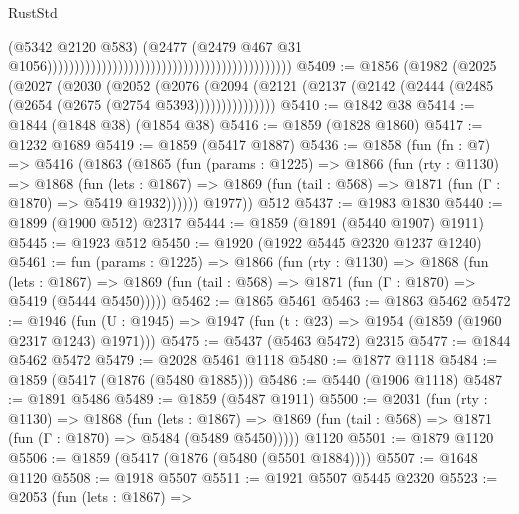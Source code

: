 \begin{lexlean}{RustStd}
\begin{coremodule}
                                                                                          (@5342
                                                                                            @2120
                                                                                            @583)
                                                                                          (@2477
                                                                                            (@2479
                                                                                              @467
                                                                                              @31
                                                                                              @1056)))))))))))))))))))))))))))))))))))))))))))))
@5409 := @1856
    (@1982
      (@2025
        (@2027
          (@2030
            (@2052
              (@2076
                (@2094 (@2121 (@2137 (@2142 (@2444 (@2485 (@2654 (@2675 (@2754 @5393)))))))))))))))
@5410 := @1842 @38
@5414 := @1844 (@1848 @38) (@1854 @38)
@5416 := @1859 (@1828 @1860)
@5417 := @1232 @1689
@5419 := @1859 (@5417 @1887)
@5436 := @1858
    (fun (fn : @7) =>
    @5416
      (@1863
        (@1865
          (fun (params : @1225) =>
          @1866
            (fun (rty : @1130) =>
            @1868
              (fun (lets : @1867) =>
              @1869 (fun (tail : @568) => @1871 (fun (Γ : @1870) => @5419 @1932))))))
        @1977))
    @512
@5437 := @1983 @1830
@5440 := @1899 (@1900 @512) @2317
@5444 := @1859 (@1891 (@5440 @1907) @1911)
@5445 := @1923 @512
@5450 := @1920 (@1922 @5445 @2320 @1237 @1240)
@5461 := fun (params : @1225) =>
  @1866
    (fun (rty : @1130) =>
    @1868
      (fun (lets : @1867) =>
      @1869 (fun (tail : @568) => @1871 (fun (Γ : @1870) => @5419 (@5444 @5450)))))
@5462 := @1865 @5461
@5463 := @1863 @5462
@5472 := @1946 (fun (U : @1945) => @1947 (fun (t : @23) => @1954 (@1859 (@1960 @2317 @1243) @1971)))
@5475 := @5437 (@5463 @5472) @2315
@5477 := @1844 @5462 @5472
@5479 := @2028 @5461 @1118
@5480 := @1877 @1118
@5484 := @1859 (@5417 (@1876 (@5480 @1885)))
@5486 := @5440 (@1906 @1118)
@5487 := @1891 @5486
@5489 := @1859 (@5487 @1911)
@5500 := @2031
    (fun (rty : @1130) =>
    @1868
      (fun (lets : @1867) =>
      @1869 (fun (tail : @568) => @1871 (fun (Γ : @1870) => @5484 (@5489 @5450)))))
    @1120
@5501 := @1879 @1120
@5506 := @1859 (@5417 (@1876 (@5480 (@5501 @1884))))
@5507 := @1648 @1120
@5508 := @1918 @5507
@5511 := @1921 @5507 @5445 @2320
@5523 := @2053
    (fun (lets : @1867) =>

\end{coremodule}
\end{lexlean}
